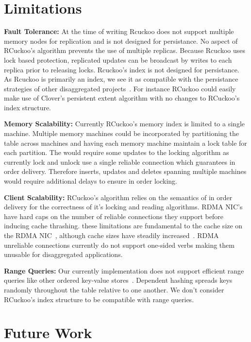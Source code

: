 \section{Limitations}
\label{sec:limations}

\textbf{Fault Tolerance:} At the time of
writing Rcuckoo does not support multiple memory nodes for
replication and is not designed for persistance. No aspect
of RCuckoo's algorithm prevents the use of multiple
replicas. Because Rcuckoo uses lock based protection,
replicated updates can be broadcast by writes to each
replica prior to releasing locks. Rcuckoo's index is not
designed for persistance. As Rcuckoo is primarily an index,
we see it as compatible with the persistance strategies of
other disaggregated projects~\cite{clover}. For instance
RCuckoo could easily make use of Clover's persistent extent
algorithm with no changes to RCuckoo's index structure.

\textbf{Memory Scalability:} Currently RCuckoo's memory index
is limited to a single machine. Multiple memory machines
could be incorporated by partitioning the table across
machines and having each memory machine maintain a lock
table for each partition. The would require some updates to
the locking algorithm as currently lock and unlock use a
single reliable connection which guarantees in order
delivery. Therefore inserts, updates and deletes spanning
multiple machines would require additional delays to ensure
in order locking.

\textbf{Client Scalability:} RCuckoo's algorithm relies on
the semantics of in order delivery for the correctness of
it's locking and reading algorithms. RDMA NIC's have hard
caps on the number of reliable connections they support
before inducing cache thrashing. these limitations are
fundamental to the cache size on the RDMA
NIC~\cite{erpc,faast,rma}, although cache sizes have
steadily increased~\cite{storm}. RDMA unreliable connections
currently do not support one-sided verbs making them
unusable for disaggregated applications.

\textbf{Range Queries:} Our currently implementation does
not support efficient range queries like other ordered
key-value stores~\cite{sherman,rolex}. Dependent hashing
spreads keys randomly throughout the table relative to one
another. We don't consider RCuckoo's index structure to be
compatible with range queries.

\section{Future Work}
\label{sec:future}

